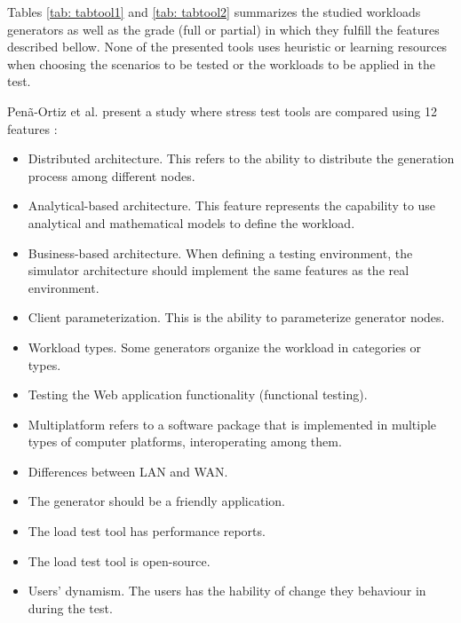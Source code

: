 \documentclass[espaco=umemeio,chapter=TITLE,twoside,openright]{abnt}
\begin{document}
Tables \ref{tab: tabtool1} and \ref{tab: tabtool2} summarizes the studied workloads generators as well as the grade (full or partial) in which they fulfill the features described bellow. None of the presented tools uses heuristic or learning resources when choosing the scenarios to be tested or the workloads to be applied in the test.

Penã-Ortiz et al. present a study where stress test tools are compared using 12 features \cite{MohammadS.Obaidat}:

\begin{itemize}
\item Distributed architecture. This refers to the ability to distribute the generation process among different nodes.
\item Analytical-based architecture. This feature represents the capability to use analytical and mathematical models to define the workload.
\item Business-based architecture. When defining a testing environment, the simulator architecture should implement the same features as the real environment.
\item Client parameterization. This is the ability to parameterize generator nodes.
\item Workload types. Some generators organize the workload in categories or types.
\item Testing the Web application functionality (functional testing).
\item Multiplatform refers to a software package that is implemented in multiple types of computer platforms, interoperating among them.
\item Differences between LAN and WAN.
\item The generator should be a friendly application.
\item The load test tool has performance reports.
\item The load test tool is open-source.
\item Users’ dynamism. The users has the hability of change they behaviour in during the test.
\end{itemize}
\end{document}
